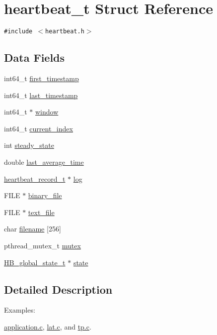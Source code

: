 \hypertarget{structheartbeat__t}{
\section{heartbeat\_\-t Struct Reference}
\label{structheartbeat__t}
}
{\tt \#include $<$heartbeat.h$>$}

\subsection*{Data Fields}
\begin{CompactItemize}
\item 
int64\_\-t \hyperlink{structheartbeat__t_0018269550d1d5a137ba5579d644009b}{first\_\-timestamp}
\item 
int64\_\-t \hyperlink{structheartbeat__t_e33b8c00263802864fb57130bf82168e}{last\_\-timestamp}
\item 
int64\_\-t $\ast$ \hyperlink{structheartbeat__t_fcf870fb9ada6e376eb17f96873dc2ae}{window}
\item 
int64\_\-t \hyperlink{structheartbeat__t_52653a3a4ad59660512c45aa99a23be0}{current\_\-index}
\item 
int \hyperlink{structheartbeat__t_6b8b47d5c5b225cced11e926bafd9df1}{steady\_\-state}
\item 
double \hyperlink{structheartbeat__t_452e7674cc72de7790228db64702c7cc}{last\_\-average\_\-time}
\item 
\hyperlink{structheartbeat__record__t}{heartbeat\_\-record\_\-t} $\ast$ \hyperlink{structheartbeat__t_6ccb40c314765bd197705a82db075585}{log}
\item 
FILE $\ast$ \hyperlink{structheartbeat__t_c5388843ff08991de5029e55915e0044}{binary\_\-file}
\item 
FILE $\ast$ \hyperlink{structheartbeat__t_e85b03466429ced3ca7912ad0e2223bc}{text\_\-file}
\item 
char \hyperlink{structheartbeat__t_8d24bb23d79044e36f9bf98eb4e75dc6}{filename} \mbox{[}256\mbox{]}
\item 
pthread\_\-mutex\_\-t \hyperlink{structheartbeat__t_db9333d409eb60db5e3e63d9b3d193a3}{mutex}
\item 
\hyperlink{structHB__global__state__t}{HB\_\-global\_\-state\_\-t} $\ast$ \hyperlink{structheartbeat__t_a7c199aeb3f806c107e64cd8aa0a0c92}{state}
\end{CompactItemize}


\subsection{Detailed Description}
\begin{Desc}
\item[Examples: ]\par


\hyperlink{application_8c-example}{application.c}, \hyperlink{lat_8c-example}{lat.c}, and \hyperlink{tp_8c-example}{tp.c}.\end{Desc}


